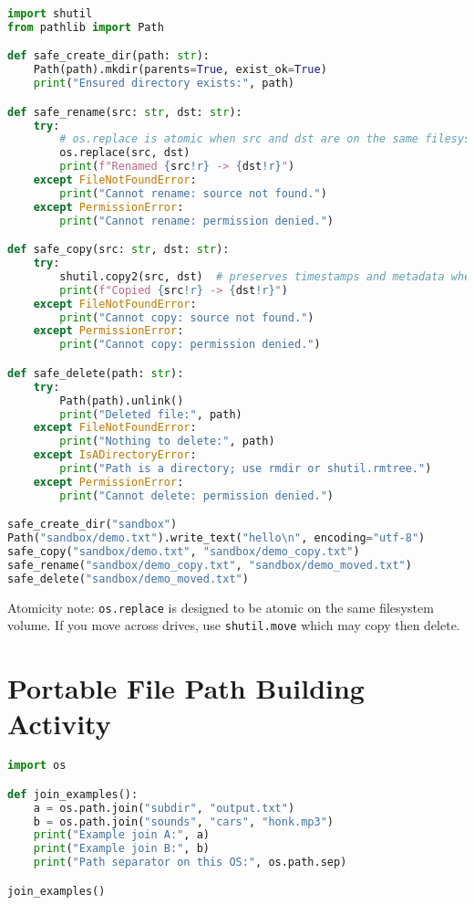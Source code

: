 \begin{lstlisting}[language=Python, caption={Safe create, rename, copy, and delete with error handling.}]
import shutil
from pathlib import Path

def safe_create_dir(path: str):
    Path(path).mkdir(parents=True, exist_ok=True)
    print("Ensured directory exists:", path)

def safe_rename(src: str, dst: str):
    try:
        # os.replace is atomic when src and dst are on the same filesystem
        os.replace(src, dst)
        print(f"Renamed {src!r} -> {dst!r}")
    except FileNotFoundError:
        print("Cannot rename: source not found.")
    except PermissionError:
        print("Cannot rename: permission denied.")

def safe_copy(src: str, dst: str):
    try:
        shutil.copy2(src, dst)  # preserves timestamps and metadata where possible
        print(f"Copied {src!r} -> {dst!r}")
    except FileNotFoundError:
        print("Cannot copy: source not found.")
    except PermissionError:
        print("Cannot copy: permission denied.")

def safe_delete(path: str):
    try:
        Path(path).unlink()
        print("Deleted file:", path)
    except FileNotFoundError:
        print("Nothing to delete:", path)
    except IsADirectoryError:
        print("Path is a directory; use rmdir or shutil.rmtree.")
    except PermissionError:
        print("Cannot delete: permission denied.")

safe_create_dir("sandbox")
Path("sandbox/demo.txt").write_text("hello\n", encoding="utf-8")
safe_copy("sandbox/demo.txt", "sandbox/demo_copy.txt")
safe_rename("sandbox/demo_copy.txt", "sandbox/demo_moved.txt")
safe_delete("sandbox/demo_moved.txt")
\end{lstlisting}

\noindent
Atomicity note: \texttt{os.replace} is designed to be atomic on the same filesystem volume. If you move across drives, use \texttt{shutil.move} which may copy then delete.

\section{Portable File Path Building Activity}

\begin{lstlisting}[language=Python, caption={Demonstrate os.path.join results on different OSes.}]
import os

def join_examples():
    a = os.path.join("subdir", "output.txt")
    b = os.path.join("sounds", "cars", "honk.mp3")
    print("Example join A:", a)
    print("Example join B:", b)
    print("Path separator on this OS:", os.path.sep)

join_examples()
\end{lstlisting}

